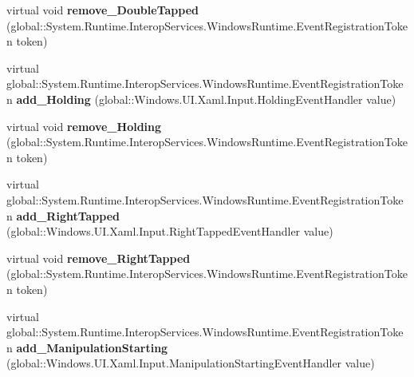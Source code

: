\begin{DoxyCompactItemize}
\item 
\mbox{\label{class_windows_1_1_u_i_1_1_xaml_1_1_u_i_element_a943e8ea205e8d92b950867b58c4406d7}} 
virtual void {\bfseries remove\+\_\+\+Double\+Tapped} (global\+::\+System.\+Runtime.\+Interop\+Services.\+Windows\+Runtime.\+Event\+Registration\+Token token)
\item 
\mbox{\label{class_windows_1_1_u_i_1_1_xaml_1_1_u_i_element_a4bbe62d6b5ea9aa8d3c4d53f196cc796}} 
virtual global\+::\+System.\+Runtime.\+Interop\+Services.\+Windows\+Runtime.\+Event\+Registration\+Token {\bfseries add\+\_\+\+Holding} (global\+::\+Windows.\+U\+I.\+Xaml.\+Input.\+Holding\+Event\+Handler value)
\item 
\mbox{\label{class_windows_1_1_u_i_1_1_xaml_1_1_u_i_element_a1cb283d7dedbabf394dd0cd9a384d808}} 
virtual void {\bfseries remove\+\_\+\+Holding} (global\+::\+System.\+Runtime.\+Interop\+Services.\+Windows\+Runtime.\+Event\+Registration\+Token token)
\item 
\mbox{\label{class_windows_1_1_u_i_1_1_xaml_1_1_u_i_element_a2013f410a096b8dec9f149c57069520c}} 
virtual global\+::\+System.\+Runtime.\+Interop\+Services.\+Windows\+Runtime.\+Event\+Registration\+Token {\bfseries add\+\_\+\+Right\+Tapped} (global\+::\+Windows.\+U\+I.\+Xaml.\+Input.\+Right\+Tapped\+Event\+Handler value)
\item 
\mbox{\label{class_windows_1_1_u_i_1_1_xaml_1_1_u_i_element_a89eaa447c459a4c2b259272790db23ad}} 
virtual void {\bfseries remove\+\_\+\+Right\+Tapped} (global\+::\+System.\+Runtime.\+Interop\+Services.\+Windows\+Runtime.\+Event\+Registration\+Token token)
\item 
\mbox{\label{class_windows_1_1_u_i_1_1_xaml_1_1_u_i_element_ab2370986b3c9a39fbf279765c5314e6a}} 
virtual global\+::\+System.\+Runtime.\+Interop\+Services.\+Windows\+Runtime.\+Event\+Registration\+Token {\bfseries add\+\_\+\+Manipulation\+Starting} (global\+::\+Windows.\+U\+I.\+Xaml.\+Input.\+Manipulation\+Starting\+Event\+Handler value)
\item 

\end{DoxyCompactItemize}
